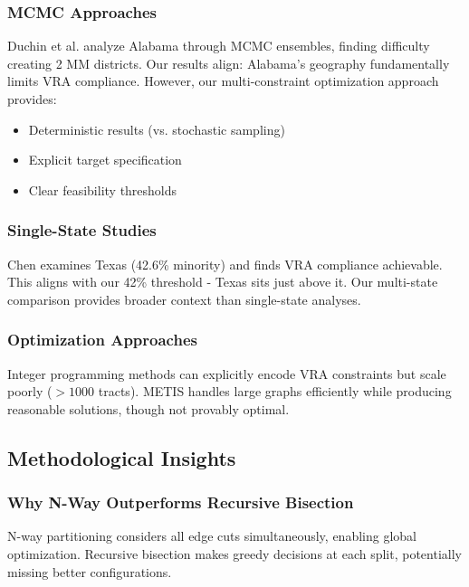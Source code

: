\subsubsection{MCMC Approaches}

Duchin et al. \citep{duchin2020alabama} analyze Alabama through MCMC ensembles, finding difficulty creating 2 MM districts. Our results align: Alabama's geography fundamentally limits VRA compliance. However, our multi-constraint optimization approach provides:
\begin{itemize}
\item Deterministic results (vs. stochastic sampling)
\item Explicit target specification
\item Clear feasibility thresholds
\end{itemize}

\subsubsection{Single-State Studies}

Chen \citep{chen2020texas} examines Texas (42.6\% minority) and finds VRA compliance achievable. This aligns with our 42\% threshold - Texas sits just above it. Our multi-state comparison provides broader context than single-state analyses.

\subsubsection{Optimization Approaches}

Integer programming methods \citep{shirabe2005} can explicitly encode VRA constraints but scale poorly ($>1000$ tracts). METIS handles large graphs efficiently while producing reasonable solutions, though not provably optimal.

\subsection{Methodological Insights}

\subsubsection{Why N-Way Outperforms Recursive Bisection}

N-way partitioning considers all edge cuts simultaneously, enabling global optimization. Recursive bisection makes greedy decisions at each split, potentially missing better configurations.


